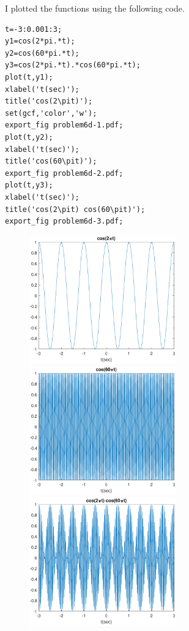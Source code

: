 \documentclass[12pt]{article}
\begin{document}
I plotted the functions using the following code.
\begin{verbatim}
t=-3:0.001:3;
y1=cos(2*pi.*t);
y2=cos(60*pi.*t);
y3=cos(2*pi.*t).*cos(60*pi.*t);
plot(t,y1);
xlabel('t(sec)');
title('cos(2\pit)');
set(gcf,'color','w');
export_fig problem6d-1.pdf;
plot(t,y2);
xlabel('t(sec)');
title('cos(60\pit)');
export_fig problem6d-2.pdf;
plot(t,y3);
xlabel('t(sec)');
title('cos(2\pit) cos(60\pit)');
export_fig problem6d-3.pdf;
\end{verbatim}
\begin{figure}[H]
    \begin{center}
        \includegraphics[width=2.5in]{problem6d-1.pdf}
		\includegraphics[width=2.5in]{problem6d-2.pdf}
		\includegraphics[width=2.5in]{problem6d-3.pdf}
    \end{center}
\end{figure}
\end{document}
